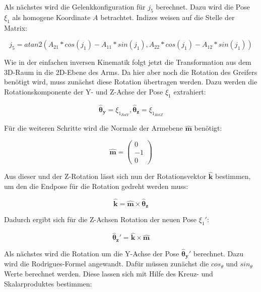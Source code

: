 Als nächstes wird die Gelenkkonfiguration für $j_5$ berechnet. Dazu wird die Pose $\xi_1$ als homogene Koordinate $A$ betrachtet. Indizes weisen auf die Stelle der Matrix:

\begin{equation}
j_5 = atan2(A_{21} * cos(j_1) - A_{11} * sin(j_1), A_{22}*cos(j_1)-A_{12} * sin(j_1))
\label{eq:27}
\end{equation}

Wie in der einfachen inversen Kinematik folgt jetzt die Transformation aus dem 3D-Raum in die 2D-Ebene des Arms. Da hier aber noch die Rotation des Greifers benötigt wird, muss zunächst diese Rotation übertragen werden. Dazu werden die Rotationskomponente der Y- und Z-Achse der Pose $\xi_1$ extrahiert:

\begin{equation}
\pmb{\hat{\theta}_y} = \xi_{1_{RotY}}, \pmb{\hat{\theta}_z} = \xi_{1_{RotZ}}  
\label{eq:20}
\end{equation}

Für die weiteren Schritte wird die Normale der Armebene $\pmb{\hat{m}}$ benötigt:

\begin{equation}
\pmb{\hat{m}} = 
\left(\begin{array}{c} 
0 \\
-1\\
0
\end{array}\right)
\label{eq:21}
\end{equation}

Aus dieser und der Z-Rotation lässt sich nun der Rotationsvektor $\pmb{\hat{k}}$ bestimmen, um den die Endpose für die Rotation gedreht werden muss:

\begin{equation}
\pmb{\hat{k}} = \pmb{\hat{m}} \times \pmb{\hat{\theta}_z} 
\label{eq:22}
\end{equation}

Dadurch ergibt sich für die Z-Achsen Rotation der neuen Pose $\xi_1'$:

\begin{equation}
\pmb{\hat{\theta}_z'} = \pmb{\hat{k}} \times \pmb{\hat{m}}
\label{eq:23}
\end{equation}

Als nächstes wird die Rotation um die Y-Achse der Pose $\pmb{\hat{\theta}_y'}$ berechnet. Dazu wird die Rodrigues-Formel angewandt. Dafür müssen zunächst die $cos_\theta$ und $sin_\theta$ Werte berechnet werden. Diese lassen sich mit Hilfe des Kreuz- und Skalarproduktes bestimmen:

